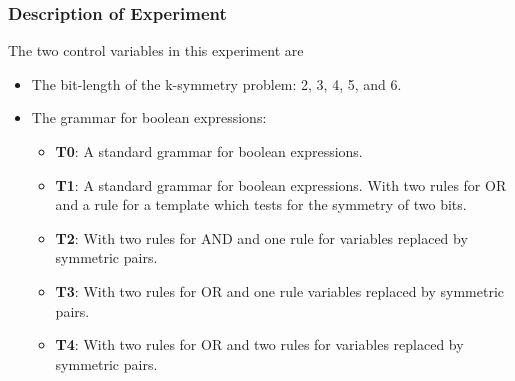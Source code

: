 \begin{frame}
\frametitle{
Description of Experiment
}
The two control variables in this experiment are
\begin{itemize}
\item The bit-length of the k-symmetry problem: 2, 3, 4, 5, and 6.
\item The grammar for boolean expressions:
\begin{itemize} 
\item {\bf T0}: A standard grammar for boolean expressions.
\item {\bf T1}: A standard grammar for boolean expressions.
            With two rules for OR and a rule for a template 
            which tests for the symmetry of two bits.
\item {\bf T2}: With two rules for AND and one rule for variables replaced
            by symmetric pairs.
\item {\bf T3}: With two rules for OR and one rule variables replaced
            by symmetric pairs.
\item {\bf T4}: With two rules for OR and two rules for variables replaced
            by symmetric pairs.
\end{itemize}
\end{itemize}
\end{frame}